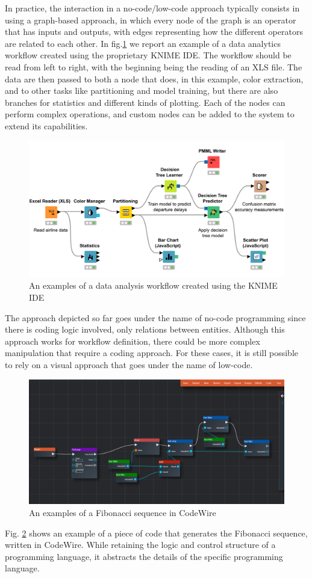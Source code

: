 \documentclass[a4paper,12pt]{article}
\begin{document}
In practice, the interaction in a no-code/low-code approach typically consists in using a graph-based approach, in which every node of the graph is an operator that has inputs and outputs, with edges representing how the different operators are related to each other. 
In fig.\ref{nocode-data} we report an example of a data analytics workflow created using the proprietary KNIME IDE. The workflow should be read from left to right, with the beginning being the reading of an XLS file. The data are then passed to both a node that does, in this example, color extraction, and to other tasks like partitioning and model training, but there are also branches for statistics and different kinds of plotting. Each of the nodes can perform complex operations, and custom nodes can be added to the system to extend its capabilities. 
\begin{figure}
\label{nocode-data}
\includegraphics[width=400pt]{nocode-data.png}
\caption{An examples of a data analysis workflow created using the KNIME IDE}
\end{figure}

The approach depicted so far goes under the name of no-code programming since there is coding logic involved, only relations between entities. Although this approach works for workflow definition, there could be more complex manipulation that require a coding approach. For these cases, it is still possible to rely on a visual approach that goes under the name of low-code. 
\begin{figure}
\label{lowcode}
\includegraphics[width=400pt]{lowcode.png}
\caption{An examples of a Fibonacci sequence in CodeWire}
\end{figure}
Fig. \ref{lowcode} shows an example of a piece of code that generates the Fibonacci sequence, written in CodeWire. While retaining the logic and control structure of a programming language, it abstracts the details of the specific programming language. 
\end{document}
